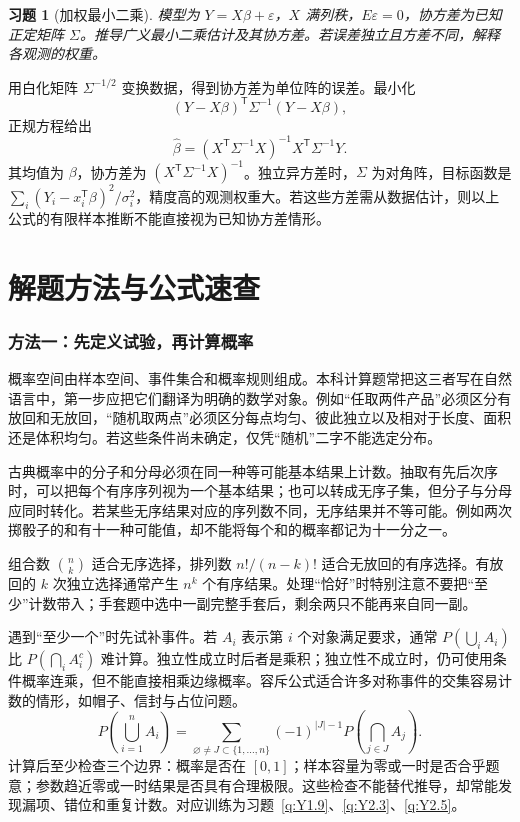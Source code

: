 \documentclass[12pt,fontset=fandol]{ctexart}
\newtheorem{exercise}{习题}[section]
\begin{document}
\begin{exercise}[加权最小二乘]\label{q:B17.24}
模型为 $Y=X\beta+\varepsilon$，$X$ 满列秩，$E\varepsilon=0$，协方差为已知正定矩阵 $\Sigma$。推导广义最小二乘估计及其协方差。若误差独立且方差不同，解释各观测的权重。\par{}
\end{exercise}

\begin{solve}\label{a:B17.24}用白化矩阵 $\Sigma^{-1/2}$ 变换数据，得到协方差为单位阵的误差。最小化\[(Y-X\beta)^\mathsf T\Sigma^{-1}(Y-X\beta),\]正规方程给出\[\widehat\beta=(X^\mathsf T\Sigma^{-1}X)^{-1}X^\mathsf T\Sigma^{-1}Y.\]其均值为 $\beta$，协方差为 $(X^\mathsf T\Sigma^{-1}X)^{-1}$。独立异方差时，$\Sigma$ 为对角阵，目标函数是 $\sum_i(Y_i-x_i^\mathsf T\beta)^2/\sigma_i^2$，精度高的观测权重大。若这些方差需从数据估计，则以上公式的有限样本推断不能直接视为已知协方差情形。\end{solve}

\clearpage
\part{解题方法与公式速查}
\section*{方法一：先定义试验，再计算概率}
概率空间由样本空间、事件集合和概率规则组成。本科计算题常把这三者写在自然语言中，第一步应把它们翻译为明确的数学对象。例如“任取两件产品”必须区分有放回和无放回，“随机取两点”必须区分每点均匀、彼此独立以及相对于长度、面积还是体积均匀。若这些条件尚未确定，仅凭“随机”二字不能选定分布。

古典概率中的分子和分母必须在同一种等可能基本结果上计数。抽取有先后次序时，可以把每个有序序列视为一个基本结果；也可以转成无序子集，但分子与分母应同时转化。若某些无序结果对应的序列数不同，无序结果并不等可能。例如两次掷骰子的和有十一种可能值，却不能将每个和的概率都记为十一分之一。

组合数 $\binom nk$ 适合无序选择，排列数 $n!/(n-k)!$ 适合无放回的有序选择。有放回的 $k$ 次独立选择通常产生 $n^k$ 个有序结果。处理“恰好”时特别注意不要把“至少”计数带入；手套题中选中一副完整手套后，剩余两只不能再来自同一副。

遇到“至少一个”时先试补事件。若 $A_i$ 表示第 $i$ 个对象满足要求，通常 $P(\bigcup_iA_i)$ 比 $P(\bigcap_iA_i^c)$ 难计算。独立性成立时后者是乘积；独立性不成立时，仍可使用条件概率连乘，但不能直接相乘边缘概率。容斥公式适合许多对称事件的交集容易计数的情形，如帽子、信封与占位问题。
\begin{equation*}
P\left(\bigcup_{i=1}^nA_i\right)
=\sum_{\varnothing\ne J\subset\{1,\ldots,n\}}(-1)^{|J|-1}P\left(\bigcap_{j\in J}A_j\right).
\end{equation*}
计算后至少检查三个边界：概率是否在 $[0,1]$；样本容量为零或一时是否合乎题意；参数趋近零或一时结果是否具有合理极限。这些检查不能替代推导，却常能发现漏项、错位和重复计数。对应训练为习题~\ref{q:Y1.9}、\ref{q:Y2.3}、\ref{q:Y2.5}。
\end{document}
